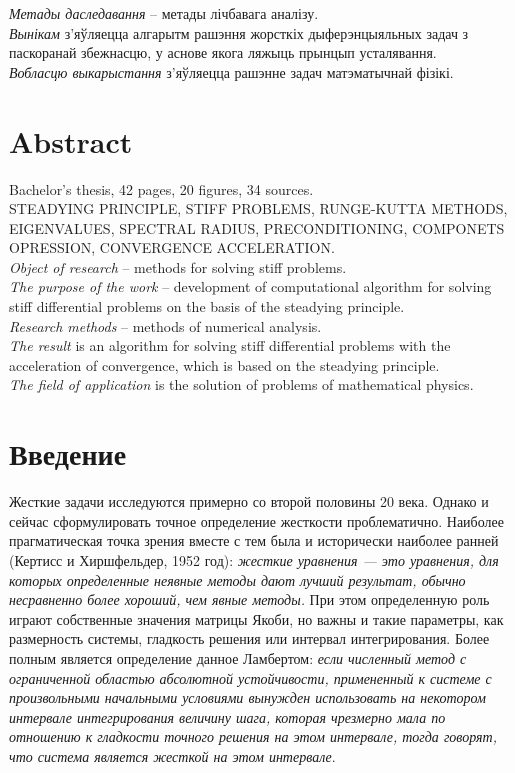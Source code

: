 \documentclass[a4paper,14pt]{extreport}
\begin{document}
\textit{Метады даследавання} – метады лічбавага аналізу.
~\\

\textit{Вынікам} з'яўляецца алгарытм рашэння жорсткіх дыферэнцыяльных задач з паскоранай збежнасцю, у аснове якога ляжыць прынцып усталявання.
~\\

\textit{Вобласцю выкарыстання} з'яўляецца рашэнне задач матэматычнай фізікі.

\chapter*{Abstract}
Bachelor's thesis, 42 pages, 20 figures, 34 sources.
~\\

STEADYING PRINCIPLE, STIFF PROBLEMS,  RUNGE-KUTTA METHODS, EIGENVALUES, SPECTRAL RADIUS, PRECONDITIONING, COMPONETS OPRESSION,  CONVERGENCE ACCELERATION.
~\\

\textit{Object of research} -- methods for solving stiff problems.
~\\

\textit{The purpose of the work} -- development of computational algorithm for solving stiff differential problems on the basis of the steadying principle.
~\\

\textit{Research methods} -- methods of numerical analysis.
~\\

\textit{The result} is an algorithm for solving stiff differential problems with the acceleration of convergence, which is based on the steadying principle.
~\\

\textit{The field of application} is the solution of problems of mathematical physics.

  {
    \renewcommand{\contentsname}{Содержание}
    \tableofcontents
  }

  \chapter*{Введение}
  Жесткие задачи исследуются примерно со второй половины 20 века. Однако и сейчас сформулировать точное определение жесткости проблематично. Наиболее прагматическая точка зрения вместе с тем была и исторически наиболее ранней (Кертисс и Хиршфельдер, 1952 год): \textit{жесткие уравнения — это уравнения, для которых определенные неявные методы дают лучший результат, обычно несравненно более хороший, чем явные методы.} При этом определенную роль играют собственные значения матрицы Якоби, но важны и такие параметры, как размерность системы, гладкость решения или интервал интегрирования. 
Более полным является определение данное Ламбертом: \textit{если численный метод с ограниченной областью абсолютной устойчивости, примененный к системе с произвольными начальными условиями вынужден использовать на некотором интервале интегрирования величину шага, которая чрезмерно мала по отношению к гладкости точного решения на этом интервале, тогда говорят, что система является жесткой на этом интервале}\cite{hairer}.
\end{document}
